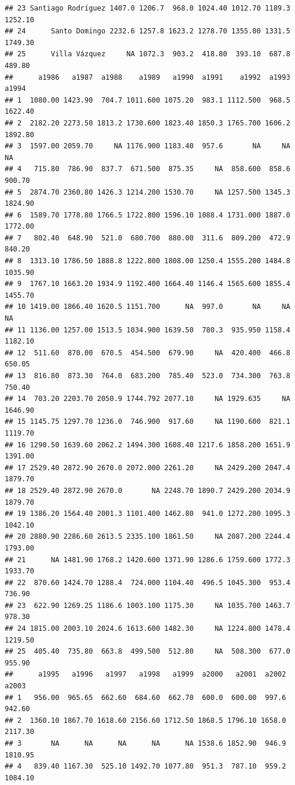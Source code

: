 \documentclass[11pt,]{article}
\begin{document}
\begin{verbatim}
## 23 Santiago Rodríguez 1407.0 1206.7  968.0 1024.40 1012.70 1189.3 1252.10
## 24      Santo Domingo 2232.6 1257.8 1623.2 1278.70 1355.00 1331.5 1749.30
## 25      Villa Vázquez     NA 1072.3  903.2  418.80  393.10  687.8  489.80
##      a1986   a1987  a1988    a1989   a1990  a1991    a1992  a1993   a1994
## 1  1080.00 1423.90  704.7 1011.600 1075.20  983.1 1112.500  968.5 1622.40
## 2  2182.20 2273.50 1813.2 1730.600 1823.40 1850.3 1765.700 1606.2 1892.80
## 3  1597.00 2059.70     NA 1176.900 1183.40  957.6       NA     NA      NA
## 4   715.80  786.90  837.7  671.500  875.35     NA  858.600  858.6  900.70
## 5  2874.70 2360.80 1426.3 1214.200 1530.70     NA 1257.500 1345.3 1824.90
## 6  1589.70 1778.80 1766.5 1722.800 1596.10 1088.4 1731.000 1887.0 1772.00
## 7   802.40  648.90  521.0  680.700  880.00  311.6  809.200  472.9  840.20
## 8  1313.10 1786.50 1888.8 1222.800 1808.00 1250.4 1555.200 1484.8 1035.90
## 9  1767.10 1663.20 1934.9 1192.400 1664.40 1146.4 1565.600 1855.4 1455.70
## 10 1419.00 1866.40 1620.5 1151.700      NA  997.0       NA     NA      NA
## 11 1136.00 1257.00 1513.5 1034.900 1639.50  780.3  935.950 1158.4 1182.10
## 12  511.60  870.00  670.5  454.500  679.90     NA  420.400  466.8  650.05
## 13  816.80  873.30  764.0  683.200  785.40  523.0  734.300  763.8  750.40
## 14  703.20 2203.70 2050.9 1744.792 2077.10     NA 1929.635     NA 1646.90
## 15 1145.75 1297.70 1236.0  746.900  917.60     NA 1190.600  821.1 1119.70
## 16 1290.50 1639.60 2062.2 1494.300 1608.40 1217.6 1858.200 1651.9 1391.00
## 17 2529.40 2872.90 2670.0 2072.000 2261.20     NA 2429.200 2047.4 1879.70
## 18 2529.40 2872.90 2670.0       NA 2248.70 1890.7 2429.200 2034.9 1879.70
## 19 1386.20 1564.40 2001.3 1101.400 1462.80  941.0 1272.200 1095.3 1042.10
## 20 2880.90 2286.60 2613.5 2335.100 1861.50     NA 2087.200 2244.4 1793.00
## 21      NA 1481.90 1768.2 1420.600 1371.90 1286.6 1759.600 1772.3 1933.70
## 22  870.60 1424.70 1288.4  724.000 1104.40  496.5 1045.300  953.4  736.90
## 23  622.90 1269.25 1186.6 1003.100 1175.30     NA 1035.700 1463.7  978.30
## 24 1815.00 2003.10 2024.6 1613.600 1482.30     NA 1224.800 1478.4 1219.50
## 25  405.40  735.80  663.8  499.500  512.80     NA  508.300  677.0  955.90
##      a1995   a1996   a1997   a1998   a1999  a2000   a2001  a2002   a2003
## 1   956.00  965.65  662.60  684.60  662.70  600.0  600.00  997.6  942.60
## 2  1360.10 1867.70 1618.60 2156.60 1712.50 1868.5 1796.10 1658.0 2117.30
## 3       NA      NA      NA      NA      NA 1538.6 1852.90  946.9 1810.95
## 4   839.40 1167.30  525.10 1492.70 1077.80  951.3  787.10  959.2 1084.10

\end{verbatim}
\end{document}
